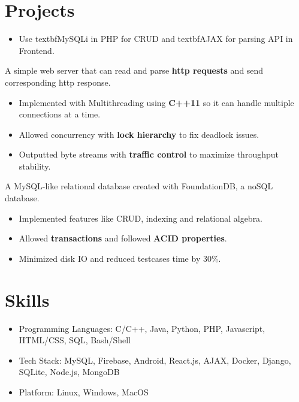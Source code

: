 \documentclass{resume}
\begin{document}
\section{Projects}
\begin{itemize}
  \item Use textbf{MySQLi} in PHP for CRUD and textbf{AJAX} for parsing API in Frontend.
\end{itemize}

  A simple web server that can read and parse \textbf{http requests} and send corresponding http response.
\begin{itemize}
  \item Implemented with Multithreading using \textbf{C++11} so it can handle multiple connections at a time.
  \item Allowed concurrency with \textbf{lock hierarchy} to fix deadlock issues.
  \item Outputted byte streams with \textbf{traffic control} to maximize throughput stability.
\end{itemize}

  A MySQL-like relational database created with FoundationDB, a noSQL database.
\begin{itemize}
  \item Implemented features like CRUD, indexing and relational algebra.
  \item Allowed \textbf{transactions} and followed \textbf{ACID properties}.
  \item Minimized disk IO and reduced testcases time by 30\%.
\end{itemize}

\section{Skills}
\begin{itemize}[parsep=0.5ex]
  \item Programming Languages: C/C++, Java, Python, PHP, Javascript, HTML/CSS, SQL, Bash/Shell
  \item Tech Stack: MySQL, Firebase, Android, React.js, AJAX, Docker, Django, SQLite, Node.js, MongoDB
  \item Platform: Linux, Windows, MacOS
\end{itemize}
\end{document}

